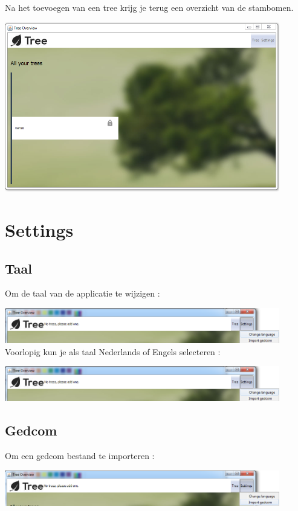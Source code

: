 \documentclass[pdftex,a4paper,12pt,twoside]{report}
\begin{document}
Na het toevoegen van een tree krijg je terug een overzicht van de stambomen.

\includegraphics[width=12cm]{images/user_treeoverview_full.png}\\[.5cm]

\section{Settings}
\subsection{Taal}
Om de taal van de applicatie te wijzigen :

\includegraphics[width=12cm]{images/change_language.png}\\[.5cm]

Voorlopig kun je als taal Nederlands of Engels selecteren :

\includegraphics[width=12cm]{images/change_language.png}\\[.5cm]

\subsection{Gedcom}
Om een gedcom bestand te importeren :

\includegraphics[width=12cm]{images/import_gedcom.png}\\[.5cm]
\end{document}
